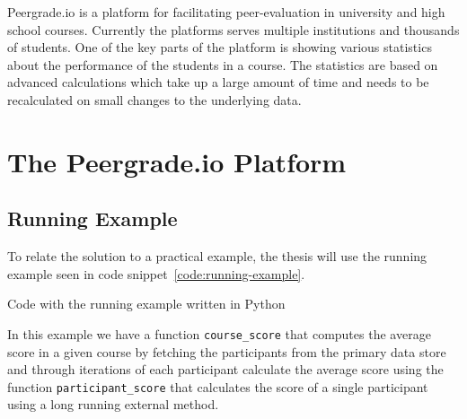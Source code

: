 Peergrade.io is a platform for facilitating peer-evaluation in university and high school courses. Currently the platforms serves multiple institutions and thousands of students. One of the key parts of the platform is showing various statistics about the performance of the students in a course. The statistics are based on advanced calculations which take up a large amount of time and needs to be recalculated on small changes to the underlying data.

\section{The Peergrade.io Platform}
\label{sec:the-peergrade-io-platform}




\subsection{Running Example}
\label{subsec:running-example}

To relate the solution to a practical example, the thesis will use the running example seen in code snippet~\ref{code:running-example}.

\begin{code}{Code with the running example written in Python}
	
	\label{code:running-example}
\end{code}

In this example we have a function \verb$course_score$ that computes the average score in a given course by fetching the participants from the primary data store and through iterations of each participant calculate the average score using the function \verb$participant_score$ that calculates the score of a single participant using a long running external method.

